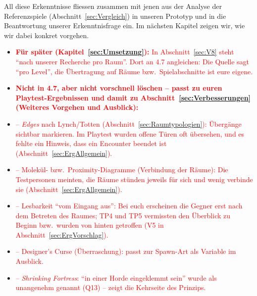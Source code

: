 \documentclass[../Main.tex]{subfiles}
\begin{document}
All diese Erkenntnisse fliessen zusammen mit jenen aus der Analyse der Referenzspiele (Abschnitt~\ref{sec:Vergleich}) in unseren Prototyp und in die Beantwortung unserer Erkenntnisfrage ein. Im nächsten Kapitel zeigen wir, wie wir dabei konkret vorgehen.

\begin{itemize}[leftmargin=1.5cm]
    \item \textcolor{red}{\textbf{Für später (Kapitel~\ref{sec:Umsetzung}):} In Abschnitt~\ref{sec:V8} steht \enquote{nach unserer Recherche pro Raum}. Dort an 4.7 angleichen: Die Quelle sagt \enquote{pro Level}, die Übertragung auf Räume bzw.\ Spielabschnitte ist eure eigene.}
    \item \textcolor{red}{\textbf{Nicht in 4.7, aber nicht vorschnell löschen -- passt zu euren Playtest-Ergebnissen und damit zu Abschnitt~\ref{sec:Verbesserungen} (Weiteres Vorgehen und Ausblick):}}
    \item \textcolor{red}{-- \textit{Edges} nach Lynch/Totten (Abschnitt~\ref{sec:Raumtypologien}): Übergänge sichtbar markieren. Im Playtest wurden offene Türen oft übersehen, und es fehlte ein Hinweis, dass ein Encounter beendet ist (Abschnitt~\ref{sec:ErgAllgemein}).}
    \item \textcolor{red}{-- Molekül- bzw.\ Proximity-Diagramme (Verbindung der Räume): Die Testpersonen meinten, die Räume stünden jeweils für sich und wenig verbinde sie (Abschnitt~\ref{sec:ErgAllgemein}).}
    \item \textcolor{red}{-- Lesbarkeit \enquote{vom Eingang aus}: Bei euch erscheinen die Gegner erst nach dem Betreten des Raumes; TP4 und TP5 vermissten den Überblick zu Beginn bzw.\ wurden von hinten getroffen (V5 in Abschnitt~\ref{sec:ErgVorschlag}).}
    \item \textcolor{red}{-- Designer's Curse (Überraschung): passt zur Spawn-Art als Variable im Ausblick.}
    \item \textcolor{red}{-- \textit{Shrinking Fortress}: \enquote{in einer Horde eingeklemmt sein} wurde als unangenehm genannt (Q13) -- zeigt die Kehrseite des Prinzips.}
\end{itemize}
\end{document}
